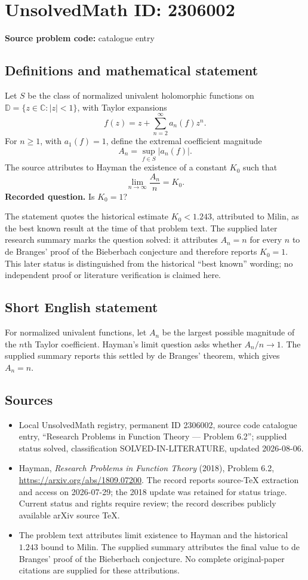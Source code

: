 \documentclass[11pt]{article}
\newcommand{\C}{\mathbb{C}}
\begin{document}
\section*{UnsolvedMath ID: 2306002}
\textbf{Source problem code:} catalogue entry
\subsection{Definitions and mathematical statement}
Let $S$ be the class of normalized univalent holomorphic functions on $\mathbb D=\{z\in\C:|z|<1\}$, with Taylor expansions
\[
 f(z)=z+\sum_{n=2}^{\infty}a_n(f)z^n.
\]
For $n\geq1$, with $a_1(f)=1$, define the extremal coefficient magnitude
\[
 A_n=\sup_{f\in S}|a_n(f)|.
\]
The source attributes to Hayman the existence of a constant $K_0$ such that
\[
 \lim_{n\to\infty}\frac{A_n}{n}=K_0.
\]
\textbf{Recorded question.} Is $K_0=1$?

The statement quotes the historical estimate $K_0<1.243$, attributed to Milin, as the best known result at the time of that problem text. The supplied later research summary marks the question solved: it attributes $A_n=n$ for every $n$ to de Branges' proof of the Bieberbach conjecture and therefore reports $K_0=1$. This later status is distinguished from the historical ``best known'' wording; no independent proof or literature verification is claimed here.
\subsection{Short English statement}
For normalized univalent functions, let $A_n$ be the largest possible magnitude of the $n$th Taylor coefficient. Hayman's limit question asks whether $A_n/n\to1$. The supplied summary reports this settled by de Branges' theorem, which gives $A_n=n$.
\subsection{Sources}
\begin{itemize}
\item Local UnsolvedMath registry, permanent ID 2306002, source code catalogue entry, ``Research Problems in Function Theory --- Problem 6.2''; supplied status solved, classification SOLVED-IN-LITERATURE, updated 2026-08-06.
\item Hayman, \emph{Research Problems in Function Theory} (2018), Problem 6.2, \url{https://arxiv.org/abs/1809.07200}. The record reports source-TeX extraction and access on 2026-07-29; the 2018 update was retained for status triage. Current status and rights require review; the record describes publicly available arXiv source TeX.
\item The problem text attributes limit existence to Hayman and the historical $1.243$ bound to Milin. The supplied summary attributes the final value to de Branges' proof of the Bieberbach conjecture. No complete original-paper citations are supplied for these attributions.
\end{itemize}
\end{document}
